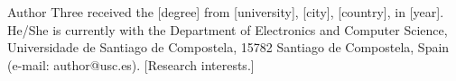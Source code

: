 \documentclass[lettersize,journal]{IEEEtran}
\begin{document}
\begin{IEEEbiographynophoto}{Author Three}
received the [degree] from [university], [city], [country], in [year].
He/She is currently with the Department of Electronics and Computer Science,
Universidade de Santiago de Compostela, 15782 Santiago de Compostela, Spain
(e-mail: author@usc.es).
[Research interests.]
\end{IEEEbiographynophoto}

\vfill
\end{document}
